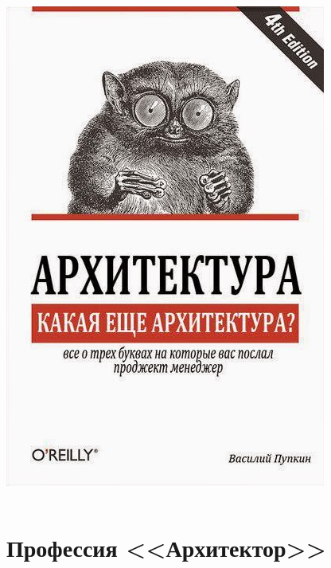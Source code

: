 \documentclass{../../slides-style}
\begin{document}
\begin{frame}
\begin{columns}
\begin{column}{0.3\textwidth}
\begin{center}
                    \includegraphics[width=\textwidth]{whatArchitecture.png}
                \end{center}
            \end{column}
        \end{columns}
    \end{frame}

    \section{Профессия <<Архитектор>>}
\end{document}
